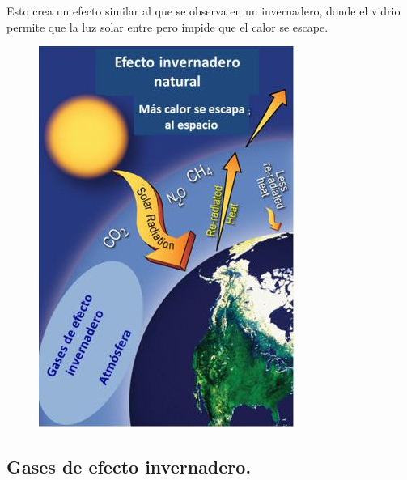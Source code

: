 \documentclass[12pt]{article}
\begin{document}
Esto crea un efecto similar al que se observa en un invernadero, donde el vidrio permite que la luz solar entre pero impide que el calor se escape.
\begin{figure}[H]
    \centering
    \includegraphics[scale=0.6]{Imagenes/Efecto_Invernadero_02.jpg}
\end{figure}
 
\subsection{Gases de efecto invernadero.}
\end{document}
